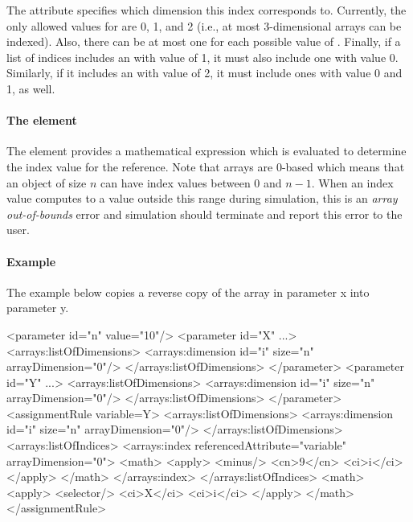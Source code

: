 The  attribute specifies which dimension this index corresponds to.
Currently, the only allowed values for  are 0, 1, and 2 (i.e., at most 3-dimensional arrays can be indexed).  Also, there can be at most one \Index for each possible value of .  Finally, if a list of indices includes an \Index with  value of 1, it must also include one with value 0.  Similarly, if it includes an \Index with  value of 2, it must include ones with value 0 and 1, as well.

\paragraph{The  element}

The  element provides a mathematical expression which is evaluated to determine the index value for the reference.  Note that arrays are 0-based which means that an object of size $n$ can have index values between 0 and $n-1$.  When an index value computes to a value outside this range during simulation, this is an \emph{array out-of-bounds} error and simulation should terminate and report this error to the user.

\paragraph{Example}

The example below copies a reverse copy of the array in parameter x into parameter y.  

\begin{example}
<parameter id="n" value="10"/>
<parameter id="X" ...>
  <arrays:listOfDimensions>
    <arrays:dimension id="i" size="n" arrayDimension="0"/>
  </arrays:listOfDimensions>
</parameter>
<parameter id="Y" ...>
  <arrays:listOfDimensions>
    <arrays:dimension id="i" size="n" arrayDimension="0"/>
  </arrays:listOfDimensions>
</parameter>
<assignmentRule variable=Y>
  <arrays:listOfDimensions>
    <arrays:dimension id="i" size="n" arrayDimension="0"/>
  </arrays:listOfDimensions>
  <arrays:listOfIndices>
    <arrays:index referencedAttribute="variable" arrayDimension="0">
      <math>
        <apply>
          <minus/>
          <cn>9</cn>
          <ci>i</ci>
        </apply>
      </math>
    </arrays:index>
  </arrays:listOfIndices>
  <math>
    <apply>
      <selector/>
      <ci>X</ci>
      <ci>i</ci>
    </apply>
  </math> 
</assignmentRule>
\end{example}

